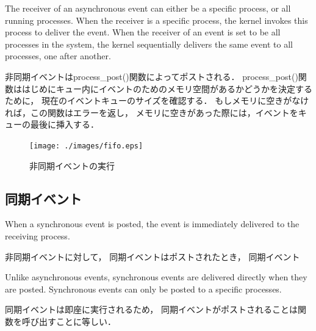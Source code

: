 The receiver of an asynchronous event can either be a specific process, or all running processes.
When the receiver is a specific process, the kernel invokes this process to deliver the event.
When the receiver of an event is set to be all processes in the system,
the kernel sequentially delivers the same event to all processes, 
one after another.

非同期イベントはprocess\_post()関数によってポストされる．
process\_post()関数ははじめにキュー内にイベントのためのメモリ空間があるかどうかを決定するために，
現在のイベントキューのサイズを確認する．
もしメモリに空きがなければ，この関数はエラーを返し，
メモリに空きがあった際には，イベントをキューの最後に挿入する．


\begin{figure}[htbp]
 \begin{center}
  \texttt{[image: ./images/fifo.eps]}
 \end{center}
 \caption{非同期イベントの実行}
 \label{fig:asynchronous_event}
\end{figure}


\subsection{同期イベント}
When a synchronous event is posted, the event is immediately delivered to the receiving process.

非同期イベントに対して，
同期イベントはポストされたとき，
同期イベント

Unlike asynchronous events, 
synchronous events are delivered directly when they are posted.
Synchronous events can only be posted to a specific processes.

同期イベントは即座に実行されるため，
同期イベントがポストされることは関数を呼び出すことに等しい．

